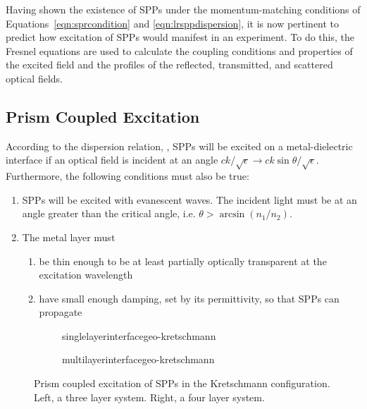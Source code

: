 Having shown the existence of SPPs under the momentum-matching conditions
of Equations~\ref{eqn:sprcondition} and \ref{eqn:lrsppdispersion}, it is
now pertinent to predict how excitation of SPPs would manifest in an
experiment.  To do this, the Fresnel equations are used to calculate the
coupling conditions and properties of the excited field and the profiles of
the reflected, transmitted, and scattered optical fields.  


\subsection{Prism Coupled Excitation}
According to the dispersion relation, , 
SPPs will be excited on a
metal-dielectric interface if an optical field is incident at an angle 
$ck/\sqrt{\epsilon} \to ck\sin\theta/\sqrt{\epsilon}$.  Furthermore, the following
conditions must also be true:
\begin{enumerate}
\item SPPs will be excited with evanescent waves.  The
incident light must be at an angle greater than the critical angle, i.e.
$\theta>\arcsin\left(n_1/n_2\right)$.
\item The metal layer must
\begin{enumerate}
\item be thin enough to be at least partially optically transparent at the excitation wavelength
\item have small enough damping, set by its permittivity, so that SPPs can propagate
\end{enumerate}
\end{enumerate}

\begin{figure}[ht]
 \centering
 \begin{subfigure}[b]{0.4\textwidth}
  \centering
  {singlelayerinterfacegeo-kretschmann}
 \end{subfigure}
 \begin{subfigure}[b]{0.4\textwidth}
  \centering
  {multilayerinterfacegeo-kretschmann}
 \end{subfigure}
\caption{Prism coupled excitation of SPPs in the Kretschmann configuration.
								Left, a three layer system.  Right, a four layer system. }
\label{fig:prismcoupledsetups}
\end{figure}

